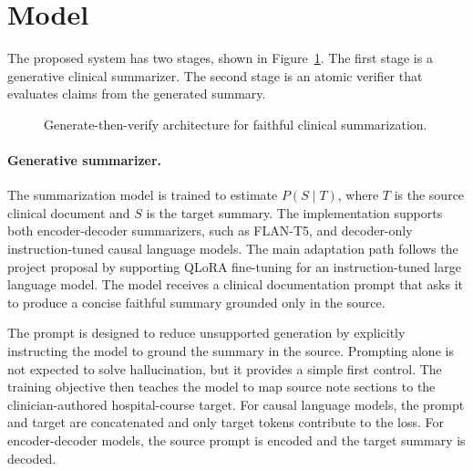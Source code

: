 \documentclass[11pt]{article}
\begin{document}
\section{Model}

The proposed system has two stages, shown in Figure~\ref{fig:pipeline}. The first stage is a generative clinical summarizer. The second stage is an atomic verifier that evaluates claims from the generated summary.

\begin{figure}[t]
\centering
{}
\caption{Generate-then-verify architecture for faithful clinical summarization.}
\label{fig:pipeline}
\end{figure}

\paragraph{Generative summarizer.}
The summarization model is trained to estimate $P(S \mid T)$, where $T$ is the source clinical document and $S$ is the target summary. The implementation supports both encoder-decoder summarizers, such as FLAN-T5, and decoder-only instruction-tuned causal language models. The main adaptation path follows the project proposal by supporting QLoRA fine-tuning for an instruction-tuned large language model. The model receives a clinical documentation prompt that asks it to produce a concise faithful summary grounded only in the source.

The prompt is designed to reduce unsupported generation by explicitly instructing the model to ground the summary in the source. Prompting alone is not expected to solve hallucination, but it provides a simple first control. The training objective then teaches the model to map source note sections to the clinician-authored hospital-course target. For causal language models, the prompt and target are concatenated and only target tokens contribute to the loss. For encoder-decoder models, the source prompt is encoded and the target summary is decoded.
\end{document}
